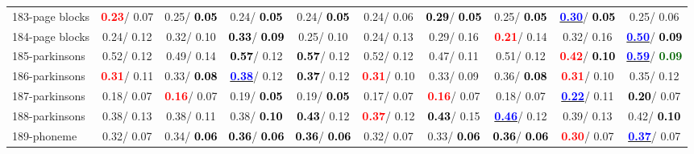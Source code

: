\begin{table}[h]
\begin{center}
{\begin{tabular}{lc|c|c|c|c|c|c|c|c}
183-page blocks & \textcolor{red}{\textbf{  0.23}}/  0.07 &   0.25/\textcolor{black}{\textbf{  0.05}} &   0.24/\textcolor{black}{\textbf{  0.05}} &   0.24/\textcolor{black}{\textbf{  0.05}} &   0.24/  0.06 & \textcolor{black}{\textbf{  0.29}}/\textcolor{black}{\textbf{  0.05}} &   0.25/\textcolor{black}{\textbf{  0.05}} & \underline{\textcolor{blue}{\textbf{  0.30}}}/\textcolor{black}{\textbf{  0.05}} &   0.25/  0.06 \\
184-page blocks &   0.24/  0.12 &   0.32/  0.10 & \textcolor{black}{\textbf{  0.33}}/\textcolor{black}{\textbf{  0.09}} &   0.25/  0.10 &   0.24/  0.13 &   0.29/  0.16 & \textcolor{red}{\textbf{  0.21}}/  0.14 &   0.32/  0.16 & \underline{\textcolor{blue}{\textbf{  0.50}}}/\textcolor{black}{\textbf{  0.09}} \\
185-parkinsons &   0.52/  0.12 &   0.49/  0.14 & \textcolor{black}{\textbf{  0.57}}/  0.12 & \textcolor{black}{\textbf{  0.57}}/  0.12 &   0.52/  0.12 &   0.47/  0.11 &   0.51/  0.12 & \textcolor{red}{\textbf{  0.42}}/\textcolor{black}{\textbf{  0.10}} & \underline{\textcolor{blue}{\textbf{  0.59}}}/\textcolor{darkgreen}{\textbf{  0.09}} \\
186-parkinsons & \textcolor{red}{\textbf{  0.31}}/  0.11 &   0.33/\textcolor{black}{\textbf{  0.08}} & \underline{\textcolor{blue}{\textbf{  0.38}}}/  0.12 & \textcolor{black}{\textbf{  0.37}}/  0.12 & \textcolor{red}{\textbf{  0.31}}/  0.10 &   0.33/  0.09 &   0.36/\textcolor{black}{\textbf{  0.08}} & \textcolor{red}{\textbf{  0.31}}/  0.10 &   0.35/  0.12 \\
187-parkinsons &   0.18/  0.07 & \textcolor{red}{\textbf{  0.16}}/  0.07 &   0.19/\textcolor{black}{\textbf{  0.05}} &   0.19/\textcolor{black}{\textbf{  0.05}} &   0.17/  0.07 & \textcolor{red}{\textbf{  0.16}}/  0.07 &   0.18/  0.07 & \underline{\textcolor{blue}{\textbf{  0.22}}}/  0.11 & \textcolor{black}{\textbf{  0.20}}/  0.07 \\
188-parkinsons &   0.38/  0.13 &   0.38/  0.11 &   0.38/\textcolor{black}{\textbf{  0.10}} & \textcolor{black}{\textbf{  0.43}}/  0.12 & \textcolor{red}{\textbf{  0.37}}/  0.12 & \textcolor{black}{\textbf{  0.43}}/  0.15 & \underline{\textcolor{blue}{\textbf{  0.46}}}/  0.12 &   0.39/  0.13 &   0.42/\textcolor{black}{\textbf{  0.10}} \\ \hline
189-phoneme &   0.32/  0.07 &   0.34/\textcolor{black}{\textbf{  0.06}} & \textcolor{black}{\textbf{  0.36}}/\textcolor{black}{\textbf{  0.06}} & \textcolor{black}{\textbf{  0.36}}/\textcolor{black}{\textbf{  0.06}} &   0.32/  0.07 &   0.33/\textcolor{black}{\textbf{  0.06}} & \textcolor{black}{\textbf{  0.36}}/\textcolor{black}{\textbf{  0.06}} & \textcolor{red}{\textbf{  0.30}}/  0.07 & \underline{\textcolor{blue}{\textbf{  0.37}}}/  0.07 \\

\end{tabular}}
\end{center}
\end{table}
